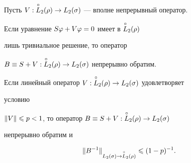 \begin{thms}


Пусть $V:\overset{\circ}{L}{}_2(\rho)\to L_2(\sigma)$ --- вполне непрерывный оператор. 


Если уравнение $S\varphi + V\varphi = 0$ имеет в $\overset{\circ}{L}{}_2(\rho)$ 


лишь тривиальное решение, то оператор 


$B\equiv S + V:\overset{\circ}{L}{}_2(\rho)\to L_2(\sigma)$ непрерывно обратим.


\end{thms}





\begin{thms}


Если линейный оператор $V:\overset{\circ}{L}{}_2(\rho)\to L_2(\sigma)$ удовлетворяет 


условию\linebreak


$\|V\|\leqslant p <1$, то оператор $B\equiv S+V:\overset{\circ}{L}{}_2(\rho)\to L_2(\sigma)$ 


непрерывно обратим и 


$$


\|B^{-1}\|_{L_2(\sigma)\to \cL(\rho)} \lea (1-p)^{-1}.


$$


\end{thms}





